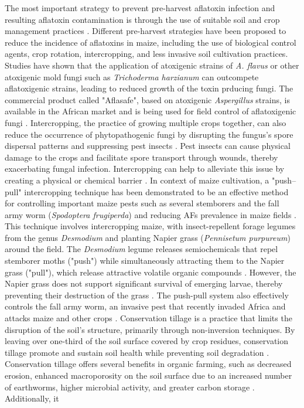 \begin{refsection}
The most important strategy to prevent pre-harvest aflatoxin infection and resulting aflatoxin contamination is through the use of suitable soil and crop management practices \citep{fouche2020aflatoxins, verheecke2016microbial}. Different pre-harvest strategies have been proposed to reduce the incidence of aflatoxins in maize, including the use of biological control agents, crop rotation, intercropping, and less invasive soil cultivation practices. Studies have shown that the application of atoxigenic strains of \textit{A. flavus} \citep{probst2011identification} or other atoxigenic mold fungi such as \textit{Trichoderma harzianum} \citep{ren2022potential, dania2020using, sivparsad2016pre} can outcompete aflatoxigenic strains, leading to reduced growth of the toxin prducing fungi. The commercial product called "Aflasafe", based on atoxigenic \textit{Aspergillus} strains, is available in the African market and is being used for field control of aflatoxigenic fungi \citep{migwi2020assessment, bandyopadhyay2016biological}.  Intercropping, the practice of growing multiple crops together, can also reduce the occurrence of phytopathogenic fungi by disrupting the fungus's spore dispersal patterns and suppressing pest insects \citep{trenbath1993intercropping, langer2007intercropping}. Pest insects can cause physical damage to the crops and facilitate spore transport through wounds, thereby exacerbating fungal infection. Intercropping can help to alleviate this issue by creating a physical or chemical barrier \citep{trenbath1993intercropping, langer2007intercropping}. In context of maize cultivation, a "push–pull" intercropping technique  has been demonstrated to be an effective method for controlling important maize pests such as several stemborers and the fall army worm (\textit{Spodoptera frugiperda}) and reducing AFs prevalence in maize fields \citep{njeru2020impact}. This technique involves intercropping maize, with insect-repellent forage legumes from the genus \textit{Desmodium} and planting Napier grass (\textit{Pennisetum purpureum}) around the field. The \textit{Desmodium} legume releases semiochemicals that repel stemborer moths ("push") while simultaneously attracting them to the Napier grass ("pull"), which release attractive volatile organic compounds \citep{njeru2020impact, khan2000exploiting, khan2011push}. However, the Napier grass does not support significant survival of emerging larvae, thereby preventing their destruction of the grass \citep{njeru2020impact, khan2011push}. The push-pull system also effectively controls the fall army worm, an invasive pest that recently invaded Africa and attacks maize and other crops \citep{njeru2020impact, khan2011push}. Conservation tillage is a practice that limits the disruption of the soil's structure, primarily through non-inversion techniques. By leaving over one-third of the soil surface covered by crop residues, conservation tillage promote and sustain soil health while preventing soil degradation \citep{peigne2007conservation}. Conservation tillage offers several benefits in organic farming, such as decreased erosion, enhanced macroporosity on the soil surface due to an increased number of earthworms, higher microbial activity, and greater carbon storage \citep{busari2015conservation}. Additionally, it 
\end{refsection}
